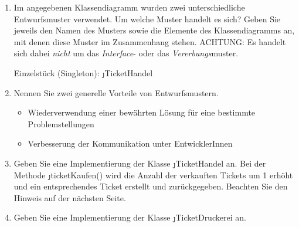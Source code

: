 \documentclass{lehramt-informatik-aufgabe}
\begin{document}
\begin{enumerate}


\item Im angegebenen Klassendiagramm wurden zwei unterschiedliche
Entwurfsmuster verwendet. Um welche Muster handelt es sich? Geben Sie
jeweils den Namen des Musters sowie die Elemente des Klassendiagramms
an, mit denen diese Muster im Zusammenhang stehen. ACHTUNG: Es handelt
sich dabei \emph{nicht} um das \emph{Interface}- oder das
\emph{Vererbungs}muster.

\begin{liAntwort}
Einzelstück (Singleton): \j{TicketHandel}

\liEntwurfsEinzelstueckUml
\liEntwurfsEinzelstueckAkteure
\end{liAntwort}


\item Nennen Sie zwei generelle Vorteile von Entwurfsmustern.

\begin{liAntwort}
\begin{itemize}
\item Wiederverwendung einer bewährten Lösung für eine bestimmte
Problemstellungen

\item Verbesserung der Kommunikation unter EntwicklerInnen
\end{itemize}
\end{liAntwort}


\item Geben Sie eine Implementierung der Klasse \j{TicketHandel} an. Bei
der Methode \j{ticketKaufen()} wird die Anzahl der verkauften Tickets um
1 erhöht und ein entsprechendes Ticket erstellt und zurückgegeben.
Beachten Sie den Hinweis auf der nächsten Seite.

\begin{liAntwort}
\end{liAntwort}


\item Geben Sie eine Implementierung der Klasse \j{TicketDruckerei} an.

\begin{liAntwort}
\end{liAntwort}


\end{enumerate}
\end{document}
